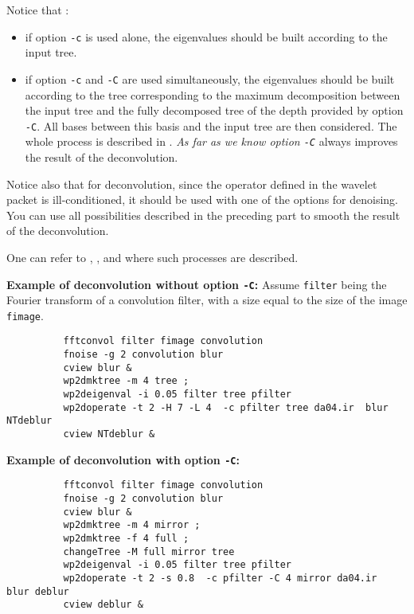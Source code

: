 \vspace*{0.5cm}

Notice that :
\begin{itemize}
\item if option \verb+-c+ is used alone, the eigenvalues should be
  built according to the input tree. 
\item  if option \verb+-c+ and \verb+-C+ are used simultaneously, the
  eigenvalues should be built according to the tree corresponding to
  the maximum decomposition between the input tree and the fully
  decomposed tree of the depth provided by option \verb+-C+. All 
  bases between this basis and the input tree are then
  considered. The whole process is described in \cite{malgouyres:framework}.
  {\em As far as we know option \verb+-C+} always improves the result of the
  deconvolution.
\end{itemize}

 Notice also that for deconvolution, since the operator defined in the
 wavelet packet is ill-conditioned,  it should be used with one of
 the options for denoising. You can use all possibilities
 described in the preceding part to smooth the result of the
 deconvolution. 

One can refer to \cite{rouge:fixed}, \cite{kalifa.mallat.ea:image},
\cite{mallat:wavelet} and \cite{malgouyres:framework} where such processes are
described. 
    
\medskip
{\bf Example of deconvolution without option \verb+-C+:}
Assume \verb+filter+ being the Fourier transform of a convolution filter, 
with a size equal to the size of the image \verb+fimage+.
  \begin{verbatim}
          fftconvol filter fimage convolution
          fnoise -g 2 convolution blur
          cview blur &
          wp2dmktree -m 4 tree ;
          wp2deigenval -i 0.05 filter tree pfilter
          wp2doperate -t 2 -H 7 -L 4  -c pfilter tree da04.ir  blur NTdeblur
          cview NTdeblur &
  \end{verbatim}

\medskip
{\bf Example of deconvolution with option \verb+-C+:}
  \begin{verbatim}
          fftconvol filter fimage convolution
          fnoise -g 2 convolution blur
          cview blur &
          wp2dmktree -m 4 mirror ;
          wp2dmktree -f 4 full ;
          changeTree -M full mirror tree
          wp2deigenval -i 0.05 filter tree pfilter
          wp2doperate -t 2 -s 0.8  -c pfilter -C 4 mirror da04.ir  blur deblur
          cview deblur &
   \end{verbatim}

